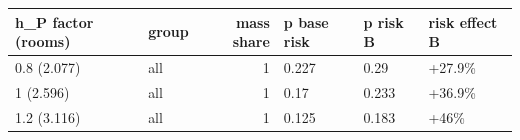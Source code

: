 \begingroup\small
\setlength{\tabcolsep}{3pt}
\renewcommand{\arraystretch}{1.04}
\begin{tabularx}{\linewidth}{XXrXXX}
\toprule
h\_P factor (rooms) & group & mass share & p base risk & p risk B & risk effect B \\
\midrule
0.8 (2.077) & all & 1 & 0.227 & 0.29 & +27.9\% \\
1 (2.596) & all & 1 & 0.17 & 0.233 & +36.9\% \\
1.2 (3.116) & all & 1 & 0.125 & 0.183 & +46\% \\
\bottomrule
\end{tabularx}
\endgroup
